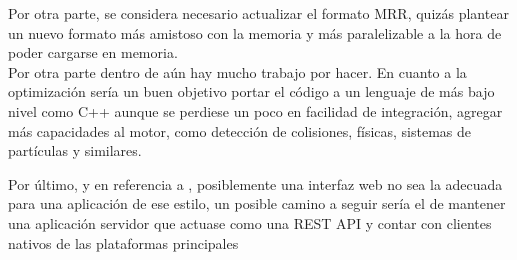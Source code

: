 Por otra parte, se considera necesario actualizar el formato MRR, quizás plantear un nuevo formato más amistoso con la memoria y más paralelizable a la hora de poder cargarse en memoria.\\

Por otra parte dentro de \robotto aún hay mucho trabajo por hacer. En cuanto a la optimización sería un buen objetivo portar el código a un lenguaje de más bajo nivel como C++ aunque se perdiese un poco en facilidad de integración, agregar más capacidades al motor, como detección de colisiones, físicas, sistemas de partículas y similares.

Por último, y en referencia a \studio, posiblemente una interfaz web no sea la adecuada para una aplicación de ese estilo, un posible camino a seguir sería el de mantener una aplicación servidor que actuase como una REST API y contar con clientes nativos de las plataformas principales
